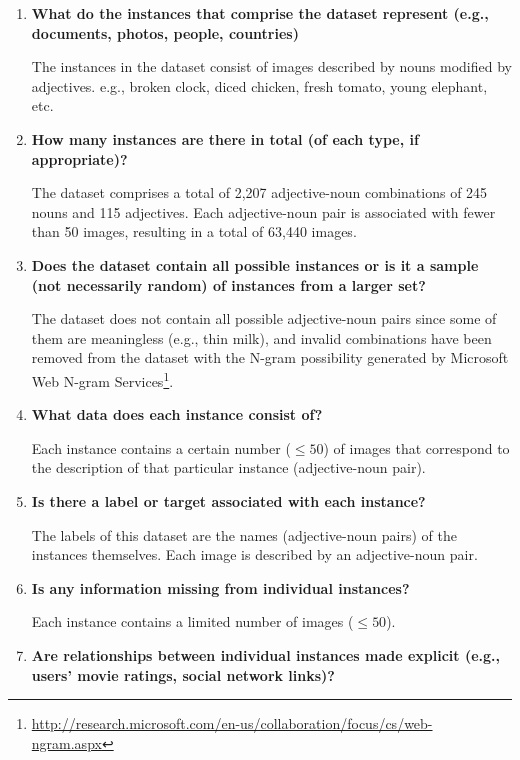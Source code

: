 \documentclass[a4paper,12pt]{article}
\begin{document}
\begin{enumerate}
    \item \textbf{What do the instances that comprise the dataset represent (e.g.,
    documents, photos, people, countries)}

    The instances in the dataset consist of images described by nouns modified by adjectives.
    e.g., broken clock, diced chicken, fresh tomato, young elephant, etc.

    \item \textbf{How many instances are there in total (of each type, if appropriate)?}
    
    
    The dataset comprises a total of 2,207 adjective-noun combinations of 245 nouns and 115 adjectives. 
    Each adjective-noun pair is associated with fewer than 50 images, 
    resulting in a total of 63,440 images.

    \item \textbf{Does the dataset contain all possible instances or is it a sample
    (not necessarily random) of instances from a larger set?}

    The dataset does not contain all possible adjective-noun pairs since some of them are meaningless (e.g., thin milk), and invalid combinations have been removed from the dataset with the N-gram possibility generated by Microsoft Web N-gram Services\footnote{\url{http://research.microsoft.com/en-us/collaboration/focus/cs/web-ngram.aspx}}. 

    \item \textbf{What data does each instance consist of?}
    
    Each instance contains a certain number ($\leq50$) of images that correspond to the description of that particular instance (adjective-noun pair).

    \item \textbf{Is there a label or target associated with each instance?}
    
    The labels of this dataset are the names (adjective-noun pairs) of the instances themselves. Each image is described by an adjective-noun pair.

    \item \textbf{Is any information missing from individual instances?}
    
    Each instance contains a limited number of images ($\leq50$).

    \item \textbf{Are relationships between individual instances made explicit
    (e.g., users' movie ratings, social network links)? }


\end{enumerate}
\end{document}

